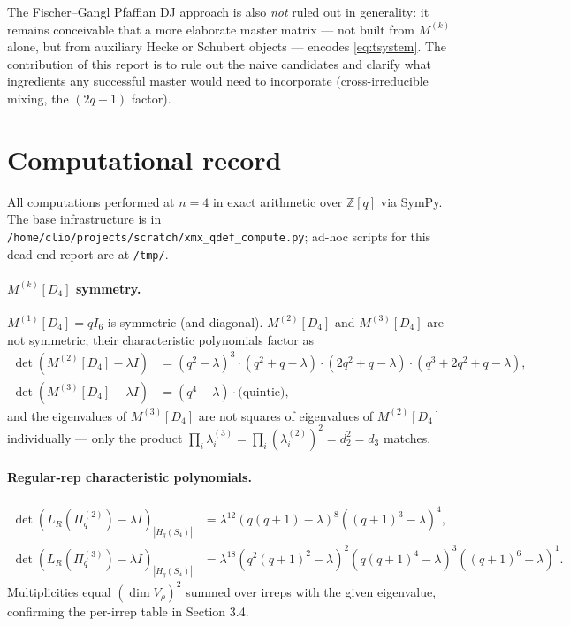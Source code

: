 \documentclass[11pt]{article}
\theoremstyle{definition}
\begin{document}
The Fischer--Gangl Pfaffian DJ approach is also \emph{not} ruled out in
generality: it remains conceivable that a more elaborate master matrix --- not
built from $M^{(k)}$ alone, but from auxiliary Hecke or Schubert objects ---
encodes \eqref{eq:tsystem}. The contribution of this report is to rule out the
naive candidates and clarify what ingredients any successful master would need
to incorporate (cross-irreducible mixing, the $(2q+1)$ factor).

\section{Computational record}

All computations performed at $n=4$ in exact arithmetic over $\mathbb{Z}[q]$ via
SymPy. The base infrastructure is in
\texttt{/home/clio/projects/scratch/xmx\_qdef\_compute.py}; ad-hoc scripts for
this dead-end report are at \texttt{/tmp/}.

\paragraph{$M^{(k)}[D_4]$ symmetry.} $M^{(1)}[D_4] = q I_6$ is symmetric (and
diagonal). $M^{(2)}[D_4]$ and $M^{(3)}[D_4]$ are not symmetric; their
characteristic polynomials factor as
\begin{align*}
\det(M^{(2)}[D_4] - \lambda I) &= (q^2 - \lambda)^3 \cdot (q^2+q-\lambda)\cdot(2q^2+q-\lambda)\cdot(q^3+2q^2+q-\lambda), \\
\det(M^{(3)}[D_4] - \lambda I) &= (q^4 - \lambda) \cdot \text{(quintic)},
\end{align*}
and the eigenvalues of $M^{(3)}[D_4]$ are not squares of eigenvalues of
$M^{(2)}[D_4]$ individually --- only the product $\prod_i \lambda_i^{(3)} =
\prod_i (\lambda_i^{(2)})^2 = d_2^2 = d_3$ matches.

\paragraph{Regular-rep characteristic polynomials.}
\begin{align*}
\det(L_R(\Pi^{(2)}_q) - \lambda I)_{|H_q(S_4)|} &= \lambda^{12} (q(q+1) - \lambda)^8 ((q+1)^3 - \lambda)^4, \\
\det(L_R(\Pi^{(3)}_q) - \lambda I)_{|H_q(S_4)|} &= \lambda^{18} (q^2(q+1)^2 - \lambda)^2 (q(q+1)^4 - \lambda)^3 ((q+1)^6 - \lambda)^1.
\end{align*}
Multiplicities equal $(\dim V_\rho)^2$ summed over irreps with the given
eigenvalue, confirming the per-irrep table in Section 3.4.
\end{document}

